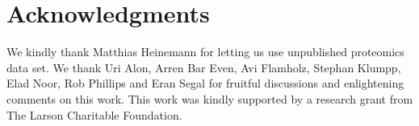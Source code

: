 \section{Acknowledgments}
We kindly thank Matthias Heinemann for letting us use unpublished proteomics data set.
We thank Uri Alon, Arren Bar Even, Avi Flamholz, Stephan Klumpp, Elad Noor, Rob Phillips and Eran Segal for fruitful discussions and enlightening comments on this work.
This work was kindly supported by a research grant from The Larson Charitable Foundation.